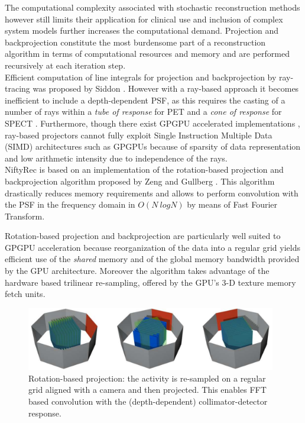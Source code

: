 \documentclass[12pt,a4paper]{report}
\begin{document}
\noindent The computational complexity associated with stochastic reconstruction methods however still limits their application 
for clinical use and inclusion of complex system models further increases the computational demand. 
Projection and backprojection constitute the most burdensome 
part of a reconstruction algorithm in terms of computational
resources and memory and are performed recursively at each iteration step. \\

Efficient computation of line integrals for projection and
backprojection by ray-tracing was proposed
by Siddon \cite{siddon_1985}. However with a ray-based approach it becomes 
inefficient to include a depth-dependent PSF, as this requires the 
casting of a number of rays within a \textit{tube of response} for PET \cite{cho_2007} and a \textit{cone of response} for SPECT \cite{zeng_1992}. 
Furthermore, though there exist GPGPU accelerated implementations \cite{xu_2009}, 
ray-based projectors cannot fully exploit Single Instruction Multiple Data (SIMD) architectures 
such as GPGPUs because of sparsity of data representation and low arithmetic intensity due to independence of the rays. \\

NiftyRec is based on an implementation of the rotation-based projection and
backprojection algorithm proposed by Zeng and Gullberg
\cite{zeng_1992}. This algorithm drastically reduces memory requirements
and allows to perform convolution with the PSF in the
frequency domain in $O(N \ logN)$ by means of Fast Fourier Transform. 

\noindent Rotation-based projection and backprojection are particularly well suited to GPGPU acceleration 
because reorganization of the data into a regular grid yields efficient use of the \textit{shared} memory 
and of the global memory bandwidth provided by the GPU architecture. Moreover the algorithm takes advantage of 
the hardware based trilinear re-sampling, offered by the GPU's 3-D texture memory fetch units.\\

\begin{figure}[h]
\centering
\includegraphics[width=4.3in]{gpu_3}
\caption{Rotation-based projection: the activity is re-sampled on a regular grid aligned with a camera and then projected. 
This enables FFT based convolution with the (depth-dependent) collimator-detector response.}
\label{fig:rotation}
\end{figure}
\end{document}
